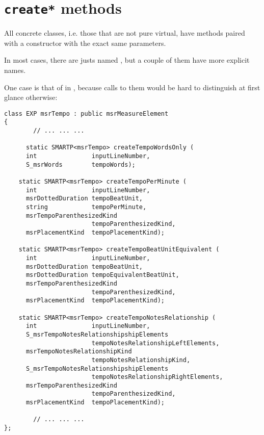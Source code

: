 \section{{\tt create*} methods}%

All concrete classes, i.e. those that are not pure virtual, have  methods paired with a constructor with the exact same parameters.

In most cases, there are justs named , but a couple of them have more explicit names.

One case is that of  in , because calls to them would be hard to distinguish at first glance otherwise:
\begin{lstlisting}[language=CPlusPlus]
 class EXP msrTempo : public msrMeasureElement
{
 		// ... ... ...

	  static SMARTP<msrTempo> createTempoWordsOnly (
      int               inputLineNumber,
      S_msrWords        tempoWords);

    static SMARTP<msrTempo> createTempoPerMinute (
      int               inputLineNumber,
      msrDottedDuration tempoBeatUnit,
      string            tempoPerMinute,
      msrTempoParenthesizedKind
                        tempoParenthesizedKind,
      msrPlacementKind  tempoPlacementKind);

    static SMARTP<msrTempo> createTempoBeatUnitEquivalent (
      int               inputLineNumber,
      msrDottedDuration tempoBeatUnit,
      msrDottedDuration tempoEquivalentBeatUnit,
      msrTempoParenthesizedKind
                        tempoParenthesizedKind,
      msrPlacementKind  tempoPlacementKind);

    static SMARTP<msrTempo> createTempoNotesRelationship (
      int               inputLineNumber,
      S_msrTempoNotesRelationshipshipElements
                        tempoNotesRelationshipLeftElements,
      msrTempoNotesRelationshipKind
                        tempoNotesRelationshipKind,
      S_msrTempoNotesRelationshipshipElements
                        tempoNotesRelationshipRightElements,
      msrTempoParenthesizedKind
                        tempoParenthesizedKind,
      msrPlacementKind  tempoPlacementKind);

		// ... ... ...
};
\end{lstlisting}


